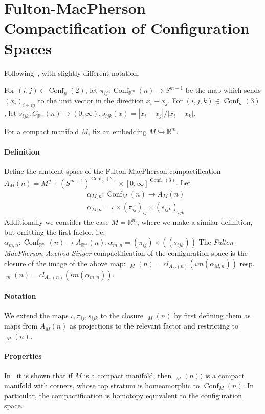 \documentclass{scrartcl}
\theoremstyle{plain}
\theoremstyle{definition}
\newcommand{\R}{\mathbb R}
\DeclareMathOperator{\Conf}{Conf}
\DeclareMathOperator{\cConf}{\overline{Conf}}
\newcommand{\abs}[1]{\left\lvert#1\right\rvert}
\begin{document}
\section{Fulton-MacPherson Compactification of Configuration Spaces}

Following~\cite{sinha2004manifold}, with slightly different notation.

For $(i,j)\in \Conf_{\underline n}(2)$, let $\pi_{ij}\colon \Conf_{\R^m}(n)\to S^{m-1}$ be the map which sends $(x_i)_{i\in\underline m}$ to the unit vector in the direction $x_i-x_j$. For $(i,j,k)\in\Conf_{\underline n}(3)$, let $s_{ijk}\colon C_{\R^m}(n) \to (0, \infty), s_{ijk}(x) = \abs{x_i-x_j} / \abs{x_i-x_k}$.

For a compact manifold $M$, fix an embedding $M \hookrightarrow \R^m$.

\paragraph{Definition} Define the ambient space of the Fulton-MacPherson compactification $A_M(n) = M^{\underline n} \times (S^{m-1})^{\Conf_{\underline n}(2)} \times [0, \infty]^{\Conf_{\underline n}(3)}$. Let 
\begin{align*}
    &\alpha_{M,n} \colon \Conf_M(n) \to A_M(n)\\
    &\alpha_{M,n} = \iota \times \left(\pi_{ij}\right)_{ij} \times \left(s_{ijk}\right)_{ijk}
\end{align*}
Additionally we consider the case $M=\R^m$, where we make a similar definition, but omitting the first factor, i.e. $\alpha_{m,n} \colon \Conf_{\R^m}(n) \to A_{\R^m}(n), \alpha_{m,n} = \left(\pi_{ij}\right) \times \left((s_{ijk})\right)$
The \emph{Fulton-MacPherson-Axelrod-Singer} compactification of the configuration space is the closure of the image of the above map: $\cConf_M(n) = cl_{A_M(n)}(im(\alpha_{M,n}))$ resp.\ $\cConf_m(n) = cl_{A_m(n)}(im(\alpha_{m,n}))$. 

\paragraph{Notation} We extend the maps $\iota, \pi_{ij}, s_{ijk}$ to the closure $\cConf_M(n)$ by first defining them as maps from $A_M(n)$ as projections to the relevant factor and restricting to $\cConf_M(n)$. 



\paragraph{Properties} In~\cite{sinha2004manifold} it is shown that if $M$ is a compact manifold, then $\cConf_M(n))$ is a compact manifold with corners, whose top stratum is homeomorphic to $\Conf_M(n)$. In particular, the compactification is homotopy equivalent to the configuration space. 
\end{document}
